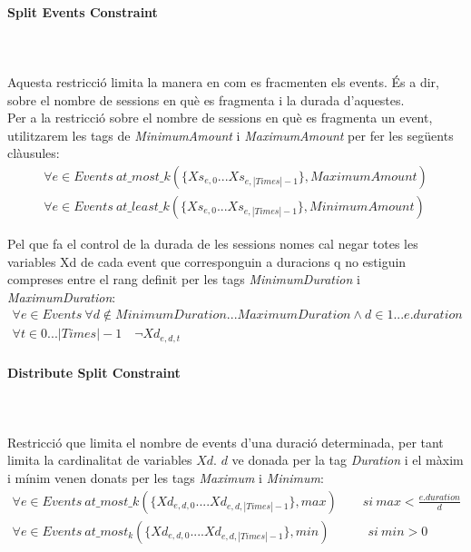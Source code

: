 \documentclass[11pt,a4paper,twoside]{report}
\begin{document}
  \paragraph*{Split Events Constraint} ~\\~\\ 
  Aquesta restricció limita la manera en com es fracmenten els events. És a dir, sobre el nombre de sessions en què es fragmenta i la durada d'aquestes.\\
  Per a la restricció sobre el nombre de sessions en què es fragmenta un event, utilitzarem les tags de \textit{MinimumAmount} i \textit{MaximumAmount} per fer les següents clàusules:
  \begin{gather*}
    \forall e \in Events \ at\_most\_k(\{Xs_{e,0} . . . Xs_{e,|Times|-1}\}, MaximumAmount)\\
    \forall e \in Events \ at\_least\_k(\{Xs_{e,0} . . . Xs_{e,|Times|-1}\}, MinimumAmount)
  \end{gather*}

  Pel que fa el control de la durada de les sessions nomes cal negar totes les variables Xd de cada event que corresponguin a duracions q no estiguin compreses entre el rang definit per les tags \textit{MinimumDuration} i \textit{MaximumDuration}:
  \begin{gather*}
    \forall e \in Events \ \forall d \notin MinimumDuration...MaximumDuration \land d \in 1 ... e.duration  \\
    \forall t \in 0...|Times|-1 \quad \neg Xd_{e,d,t}
  \end{gather*}

  \paragraph*{Distribute Split Constraint} ~\\~\\

  Restricció que limita el nombre de events d'una duració determinada, per tant limita la cardinalitat de variables $Xd$. $d$ ve donada per la tag \textit{Duration} i el màxim i mínim venen donats per les tags \textit{Maximum} i \textit{Minimum}:
  \begin{gather*}
  \forall e \in Events \ at\_most\_k(\{Xd_{e,d,0} .... Xd_{e,d,|Times|-1}\}, max) \quad \quad si \ max<\frac{e.duration}{d}\\
  \forall e \in Events \ at\_most_k(\{Xd_{e,d,0} .... Xd_{e,d,|Times|-1}\}, min) \quad \quad \quad si \ min>0\\
  \end{gather*}
\end{document}
